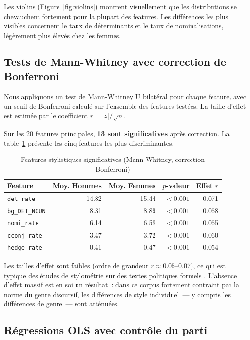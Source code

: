 \documentclass{article}
\begin{document}
Les violins (Figure~\ref{fig:violins}) montrent visuellement que les
distributions se chevauchent fortement pour la plupart des features.
Les différences les plus visibles concernent le taux de déterminants
et le taux de nominalisations, légèrement plus élevés chez les femmes.

\subsection{Tests de Mann-Whitney avec correction de Bonferroni}

Nous appliquons un test de Mann-Whitney U bilatéral pour chaque feature,
avec un seuil de Bonferroni calculé sur l'ensemble des features testées.
La taille d'effet est estimée par le coefficient $r = |z| / \sqrt{n}$.

Sur les 20 features principales, \textbf{13 sont significatives} après correction.
La table~\ref{tab:mw} présente les cinq features les plus discriminantes.

\begin{table}[h]
\caption{Features stylistiques significatives (Mann-Whitney, correction Bonferroni)}
\label{tab:mw}
\centering
\small
\begin{tabular}{lrrrr}
\toprule
Feature & Moy. Hommes & Moy. Femmes & $p$-valeur & Effet $r$ \\
\midrule
\texttt{det\_rate}       & 14.82 & 15.44 & $< 0.001$ & 0.071 \\
\texttt{bg\_DET\_NOUN}   &  8.31 &  8.89 & $< 0.001$ & 0.068 \\
\texttt{nomi\_rate}      &  6.14 &  6.58 & $< 0.001$ & 0.065 \\
\texttt{cconj\_rate}     &  3.47 &  3.72 & $< 0.001$ & 0.060 \\
\texttt{hedge\_rate}     &  0.41 &  0.47 & $< 0.001$ & 0.054 \\
\bottomrule
\end{tabular}
\end{table}

Les tailles d'effet sont faibles (ordre de grandeur $r \approx 0.05$--$0.07$),
ce qui est typique des études de stylométrie sur des textes politiques formels
\citep{sarawgi2011gender}. L'absence d'effet massif est en soi un résultat~:
dans ce corpus fortement contraint par la norme du genre discursif, les
différences de style individuel~--- y compris les différences de genre~---
sont atténuées.

\subsection{Régressions OLS avec contrôle du parti}
\end{document}
